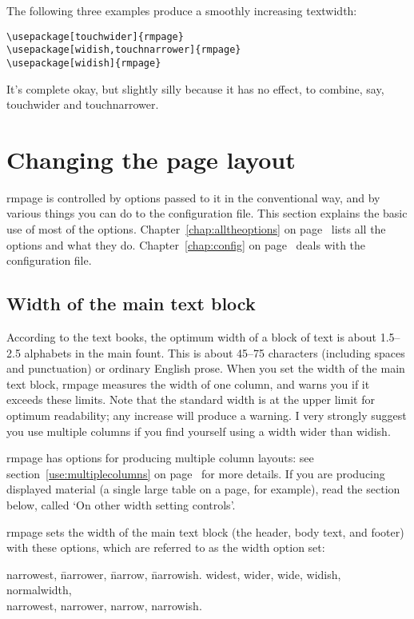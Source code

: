 \documentclass[11pt,loose,twoside,touchwider,longish,
                      noheaders,a4paper,notstdmargins]{report}
\DeclareRobustCommand*{\comname}[1]{{\ttfamily\makeatletter\bs #1\makeatother}}
\newcommand*{\classname}[1]{{\ttfamily #1}}
\newcommand*{\optname}[1]{{\ttfamily #1}}
\newcommand*{\rmpage}{\classname{rmpage}\xspace}
\begin{document}
The following three examples produce a smoothly increasing
\comname{textwidth}:
\begin{verbatim}
\usepackage[touchwider]{rmpage}
\usepackage[widish,touchnarrower]{rmpage}
\usepackage[widish]{rmpage}
\end{verbatim}

It's complete okay, but slightly silly because it has no effect, to
combine, say, \optname{touchwider} and \optname{touchnarrower}.

\section{Changing the page layout}
\label{use:changingpagelayout}

\rmpage is controlled by options passed to it in the conventional way,
and by various things you can do to the configuration file.  This
section explains the basic use of most of the options.
Chapter~\ref{chap:alltheoptions} on page~\pageref{chap:alltheoptions}
lists all the options and what they do.  Chapter~\ref{chap:config} on
page~\pageref{chap:config} deals with the configuration file.


\subsection{Width of the main text block}

\label{use:width}

According to the text books, the optimum width of a block of text is
about 1.5--2.5 alphabets in the main fount.  This is about 45--75
characters (including spaces and punctuation) or ordinary English
prose.  When you set the width of the main text block, \rmpage
measures the width of one column, and warns you if it exceeds these
limits.  Note that the standard width is at the upper limit for
optimum readability; any increase will produce a warning.  I very
strongly suggest you use multiple columns if you find yourself using a
width wider than \optname{widish}.

\rmpage has options for producing multiple column layouts: see
section~\ref{use:multiplecolumns} on
page~\pageref{use:multiplecolumns} for more details.  If you are
producing displayed material (a single large table on a page, for
example), read the section below, called `On other width setting
controls'.

\rmpage sets the width of the main text block (the header, body text,
and footer) with these options, which are referred to as the width
option set:
\begin{tabbing}
\optname{narrowest}, \= \optname{narrower}, \= \optname{narrow}, \=
\optname{narrowish}.\kill
\optname{widest}, \> \optname{wider}, \> \optname{wide}, \>
\optname{widish}, \\
\optname{normalwidth},\\
\optname{narrowest}, \> \optname{narrower}, \> \optname{narrow}, \>
\optname{narrowish}.
\end{tabbing}
\end{document}
